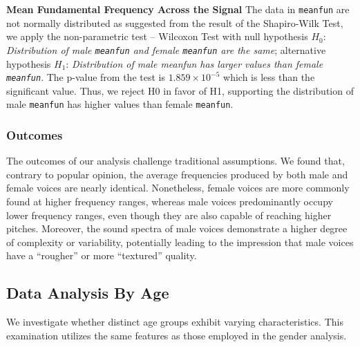 \documentclass{article}
\begin{document}
	\textbf{Mean Fundamental Frequency Across the Signal} The data in \texttt{meanfun} are not normally distributed as suggested from the result of the Shapiro-Wilk Test, we apply the non-parametric test -- Wilcoxon Test with null hypothesis $H_0$: \textit{Distribution of male \texttt{meanfun} and female \texttt{meanfun} are the same}; alternative hypothesis $H_1$: \textit{Distribution of male meanfun has larger values than female \texttt{meanfun}}. The p-value from the test is $1.859\times 10^{-5}$ which is less than the significant value. Thus, we reject H0 in favor of H1, supporting the distribution of male \texttt{meanfun} has higher values than female \texttt{meanfun}.
	
	
	
	\subsubsection{Outcomes}
	
	The outcomes of our analysis challenge traditional assumptions. We found that, contrary to popular opinion, the average frequencies produced by both male and female voices are nearly identical. Nonetheless, female voices are more commonly found at higher frequency ranges, whereas male voices predominantly occupy lower frequency ranges, even though they are also capable of reaching higher pitches. Moreover, the sound spectra of male voices demonstrate a higher degree of complexity or variability, potentially leading to the impression that male voices have a ``rougher'' or more ``textured'' quality.	
	
	\subsection{Data Analysis By Age}
	We investigate whether distinct age groups exhibit varying characteristics. This examination utilizes the same features as those employed in the gender analysis.
	
\end{document}

